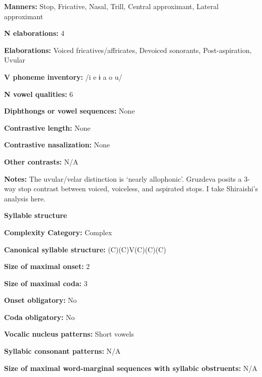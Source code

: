 \textbf{Manners:} Stop, Fricative, Nasal, Trill, Central approximant, Lateral approximant



\textbf{N elaborations:} 4



\textbf{Elaborations:} Voiced fricatives/affricates, Devoiced sonorants, Post-aspiration, Uvular



\textbf{V phoneme inventory:} /i e ɨ a o u/



\textbf{N vowel qualities:} 6



\textbf{Diphthongs or vowel sequences:} None



\textbf{Contrastive length:} None



\textbf{Contrastive nasalization:} None



\textbf{Other contrasts:} N/A



\textbf{Notes:} The uvular/velar distinction is ‘nearly allophonic’. Gruzdeva posits a 3-way stop contrast between voiced, voiceless, and aspirated stops. I take Shiraishi’s analysis here.



\textbf{Syllable structure}



\textbf{Complexity Category:} Complex



\textbf{Canonical syllable structure:} (C)(C)V(C)(C)(C) \citep[29-30]{Shiraishi2006}



\textbf{Size of maximal onset:} 2



\textbf{Size of maximal coda:} 3



\textbf{Onset obligatory:} No



\textbf{Coda obligatory:} No



\textbf{Vocalic nucleus patterns:} Short vowels



\textbf{Syllabic consonant patterns:} N/A



\textbf{Size of maximal word{}-marginal sequences with syllabic obstruents:} N/A



